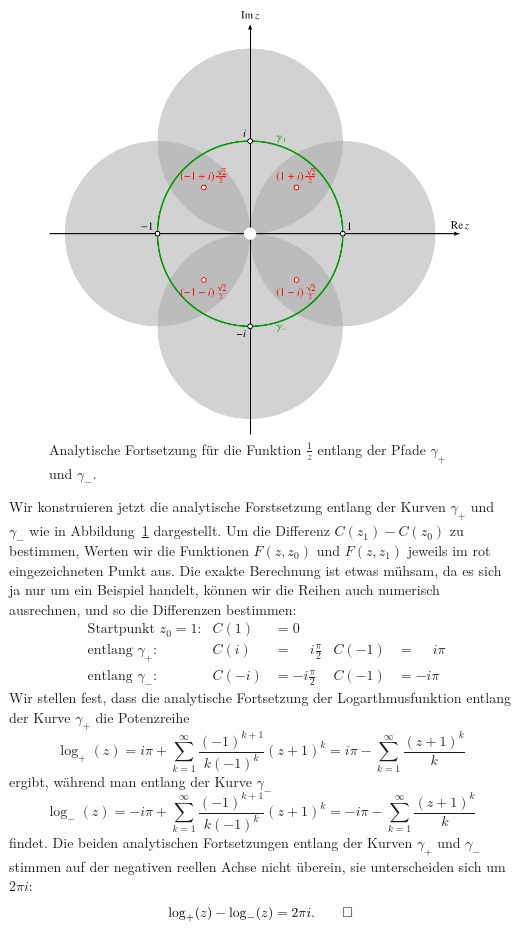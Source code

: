 \begin{beispiel}
\begin{figure}
\centering
\includegraphics{chapters/080-funktionentheorie/images/fortsetzreziprok.pdf}
\caption{Analytische Fortsetzung für die Funktion $\frac1z$
entlang der Pfade $\gamma_+$ und $\gamma_-$.
\label{komplex:logfortsetzung}}
\end{figure}
Wir konstruieren jetzt die analytische Forstsetzung entlang der Kurven
$\gamma_+$ und $\gamma_-$ wie in Abbildung~\ref{komplex:logfortsetzung}
dargestellt.
Um die Differenz $C(z_1)-C(z_0)$ zu bestimmen, Werten wir die Funktionen
$F(z,z_0)$ und $F(z,z_1)$ jeweils im rot eingezeichneten Punkt aus.
Die exakte Berechnung ist etwas mühsam, da es sich ja nur um ein Beispiel
handelt, können wir die Reihen auch numerisch ausrechnen, und so die
Differenzen bestimmen:
\begin{align*}
&\text{Startpunkt $z_0=1$:}& C(1)&=0             &       &       \\
&\text{entlang $\gamma_+$:}& C(i)&=\phantom{-}i\frac{\pi}2 & C(-1) &=\phantom{-}i\pi\\
&\text{entlang $\gamma_-$:}&C(-i)&=-i\frac{\pi}2 & C(-1) &= -i\pi
\end{align*}
Wir stellen fest, dass die analytische Fortsetzung der Logarthmusfunktion
entlang der Kurve $\gamma_+$ die Potenzreihe
\[
\log_+(z)
=
i\pi +\sum_{k=1}^\infty \frac{(-1)^{k+1}}{k(-1)^k}(z+1)^k
=
i\pi
-
\sum_{k=1}^\infty \frac{(z+1)^k}{k}
\]
ergibt, während man entlang der  Kurve $\gamma_-$
\[
\log_-(z)
=
-i\pi +\sum_{k=1}^\infty \frac{(-1)^{k+1}}{k(-1)^k}(z+1)^k
=
-i\pi
-
\sum_{k=1}^\infty \frac{(z+1)^k}{k}
\]
findet.
Die beiden analytischen Fortsetzungen entlang der Kurven $\gamma_+$ und
$\gamma_-$ stimmen auf der negativen reellen Achse nicht überein,
sie unterscheiden sich um $2\pi i$:
\[
\log_+(z)-\log_-(z)=2\pi i.
\qedhere
\]
\end{beispiel}

